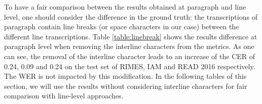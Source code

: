To have a fair comparison between the results obtained at paragraph and line level, one should consider the difference in the ground truth: the transcriptions of paragraph contain line breaks (or space characters in our case) between the different line transcriptions. Table \ref{table:linebreak} shows the \modelacc{} results difference at paragraph level when removing the interline characters from the metrics. As one can see, the removal of the interline character leads to an increase of the CER of 0.24, 0.09 and 0.24 on the test set of RIMES, IAM and READ 2016 respectively. The WER is not impacted by this modification. In the following tables of this section, we will use the results without considering interline characters for fair comparison with line-level approaches.


\begin{table}[!h]
    \caption{\modelacc{} results at paragraph level with and without interline characters in ground truth for RIMES, IAM and READ 2016 dataset.}
    \centering
    \label{table:linebreak}
\end{table}


